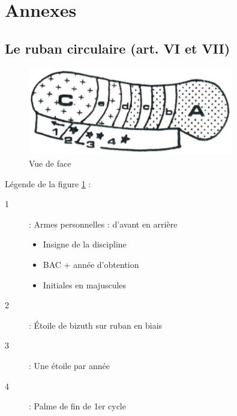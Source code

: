 \chapter*{Annexes}
% 

\section*{Le ruban circulaire (art. VI et VII)}
\begin{figure}[h]
\centering
	\includegraphics*[width=0.80\textwidth]{front}
   \caption{Vue de face}
   \label{FIG:circulaire}
\end{figure}


Légende de la figure \ref{FIG:circulaire} :
\begin{description}
\item[1]: Armes personnelles : d'avant en arrière
	\begin{itemize}
	\item Insigne de la discipline
	\item BAC + année d'obtention
	\item Initiales en majuscules
	\end{itemize}
\item[2] : Étoile de bizuth sur ruban en biais
\item[3] : Une étoile par année
\item[4] : Palme de fin de 1er cycle
\end{description}


